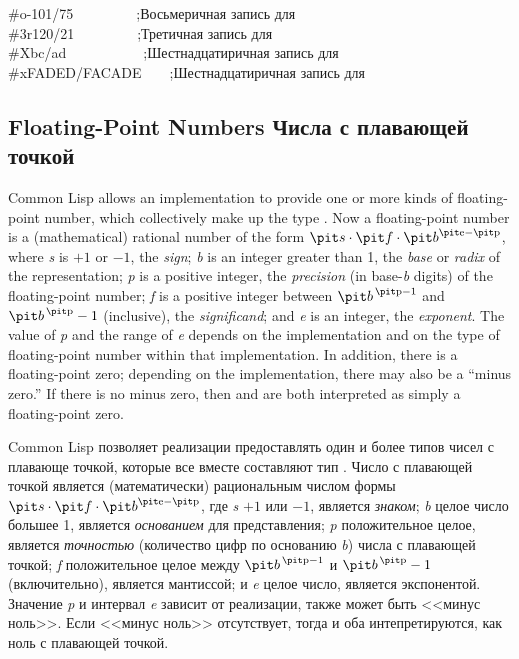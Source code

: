 \begin{lisp}
\#o-101/75~~~~~~~~~;{\rm Восьмеричная запись для } \\
\#3r120/21~~~~~~~~~;{\rm Третичная запись для } \\
\#Xbc/ad~~~~~~~~~~~;{\rm Шестнадцатиричная запись для } \\
\#xFADED/FACADE~~~~;{\rm Шестнадцатиричная запись для } 
\end{lisp}

\subsection{Floating-Point Numbers Числа с плавающей точкой}

Common Lisp allows an implementation to provide one or more kinds of
floating-point number, which collectively make up the type .
Now a floating-point number is a (mathematical)
rational number of the form
${\it s} \cdot {\it f} \cdot {\it b}^{\hbox{\scriptsize\it e}-\hbox{\scriptsize\it p}}$,
where {\it s} is $+1$ or $-1$, the {\it sign};
{\it b} is an integer greater than 1,
the {\it base} or {\it radix} of the representation;
{\it p} is a positive integer,
the {\it precision} (in base-{\it b} digits) of the floating-point number;
{\it f} is a positive integer between
${\it b}^{\,\hbox{\scriptsize\it p}-1}$ and ${\it b}^{\,\hbox{\scriptsize\it p}}-1$ (inclusive),
the {\it significand};
and {\it e} is an integer, the {\it exponent}.
The value of {\it p} and the range of {\it e}
depends on the implementation and on the type of floating-point number
within that implementation.
In addition, there is a floating-point zero;
depending on the implementation, there may also be a ``minus zero.''
If there is no minus zero, then  and  are
both interpreted as simply a floating-point zero.

Common Lisp позволяет реализации предоставлять один и более типов чисел с
плавающе точкой, которые все вместе составляют тип .
Число с плавающей точкой является (математически) рациональным числом формы
${\it s} \cdot {\it f} \cdot {\it b}^{\hbox{\scriptsize\it e}-\hbox{\scriptsize\it p}}$,
где {\it s} $+1$ или $-1$, является {\it знаком};
{\it b} целое число большее 1,
является {\it основанием} для представления;
{\it p} положительное целое, является {\it точностью} (количество цифр по
основанию {\it b}) числа с плавающей точкой;
{\it f} положительное целое между ${\it b}^{\,\hbox{\scriptsize\it p}-1}$ и
${\it b}^{\,\hbox{\scriptsize\it p}}-1$ (включительно), является мантиссой;
и {\it e} целое число, является экспонентой.
Значение {\it p} и интервал {\it e} зависит от реализации, также может быть
<<минус ноль>>. Если <<минус ноль>> отсутствует, тогда  и  оба
интепретируются, как ноль с плавающей точкой.

